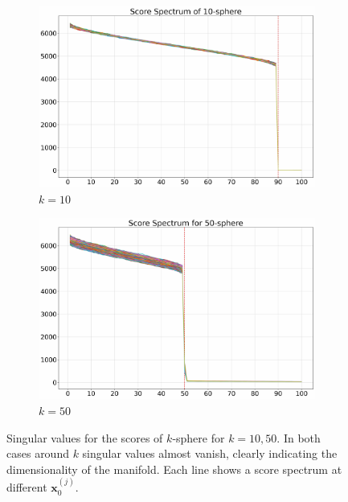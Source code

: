 \begin{figure}[htbp]
    \centering
    \begin{subfigure}[b]{0.49\linewidth}
        \centering
        \includegraphics[width=\linewidth]{Chapter3/figures/10_sphere_spectrum.jpg}
        \caption{$k=10$}
        \label{ch3:fig:ksphere10}
    \end{subfigure}
    \hfill
    \begin{subfigure}[b]{0.49\linewidth}
        \centering
        \includegraphics[width=\linewidth]{Chapter3/figures/50_sphere_spectrum.jpg}
        \caption{$k=50$}
        \label{ch3:fig:ksphere50}
    \end{subfigure}
    \caption{Singular values for the scores of $k$-sphere for $k=10, 50$. 
    In both cases around $k$ singular values almost vanish, clearly indicating the dimensionality of the manifold. Each line shows a score spectrum at different $\textbf{x}_0^{(j)}$.}
    \label{ch3:fig:ksphere}
\end{figure}


